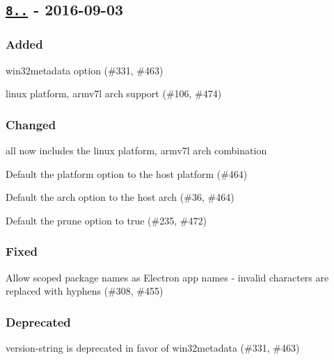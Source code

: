 \subsection*{\href{https://github.com/electron-userland/electron-packager/compare/v7.7.0...v8.0.0}{\tt 8..} -\/ 2016-\/09-\/03}

\subsubsection*{Added}


\begin{DoxyItemize}
\item {\ttfamily win32metadata} option (\#331, \#463)
\item {\ttfamily linux} platform, {\ttfamily armv7l} arch support (\#106, \#474)
\end{DoxyItemize}

\subsubsection*{Changed}


\begin{DoxyItemize}
\item {\ttfamily all} now includes the {\ttfamily linux} platform, {\ttfamily armv7l} arch combination
\item Default the {\ttfamily platform} option to the host platform (\#464)
\item Default the {\ttfamily arch} option to the host arch (\#36, \#464)
\item Default the {\ttfamily prune} option to {\ttfamily true} (\#235, \#472)
\end{DoxyItemize}

\subsubsection*{Fixed}


\begin{DoxyItemize}
\item Allow scoped package names as Electron app names -\/ invalid characters are replaced with hyphens (\#308, \#455)
\end{DoxyItemize}

\subsubsection*{Deprecated}


\begin{DoxyItemize}
\item {\ttfamily version-\/string} is deprecated in favor of {\ttfamily win32metadata} (\#331, \#463)
\end{DoxyItemize}

